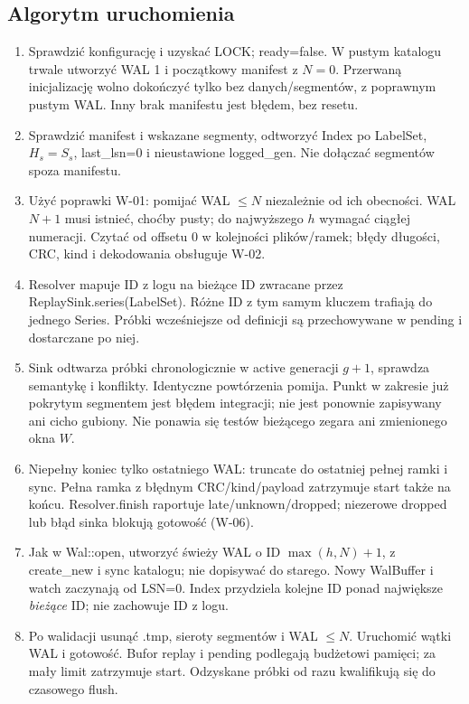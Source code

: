 \documentclass[11pt,a4paper]{article}
\begin{document}
\subsection{Algorytm uruchomienia}
\begin{enumerate}
\item Sprawdzić konfigurację i uzyskać LOCK; ready=false.
W pustym katalogu trwale utworzyć WAL 1 i początkowy manifest z $N=0$.
Przerwaną inicjalizację wolno dokończyć tylko bez danych/segmentów,
z poprawnym pustym WAL. Inny brak manifestu jest błędem, bez resetu.
\item Sprawdzić manifest i wskazane segmenty, odtworzyć Index po
LabelSet, $H_s=S_s$, last\_lsn=0 i nieustawione logged\_gen.
Nie dołączać segmentów spoza manifestu.
\item Użyć poprawki W-01: pomijać WAL $\leq N$ niezależnie od ich obecności.
WAL $N+1$ musi istnieć, choćby pusty; do najwyższego $h$ wymagać ciągłej numeracji.
Czytać od offsetu 0 w kolejności plików/ramek; błędy długości,
CRC, kind i dekodowania obsługuje W-02.
\item Resolver mapuje ID z logu na bieżące ID zwracane przez
ReplaySink.series(LabelSet). Różne ID z tym samym kluczem trafiają
do jednego Series. Próbki wcześniejsze od definicji są przechowywane
w pending i dostarczane po niej.
\item Sink odtwarza próbki chronologicznie w active generacji $g+1$,
sprawdza semantykę i konflikty. Identyczne powtórzenia pomija.
Punkt w zakresie już pokrytym segmentem jest błędem integracji;
nie jest ponownie zapisywany ani cicho gubiony.
Nie ponawia się testów bieżącego zegara ani zmienionego okna $W$.
\item Niepełny koniec tylko ostatniego WAL: truncate do ostatniej
pełnej ramki i sync. Pełna ramka z błędnym CRC/kind/payload zatrzymuje
start także na końcu. Resolver.finish raportuje late/unknown/dropped;
niezerowe dropped lub błąd sinka blokują gotowość (W-06).
\item Jak w Wal::open, utworzyć świeży WAL o ID
$\max(h,N)+1$, z create\_new i sync katalogu; nie dopisywać do starego.
Nowy WalBuffer i watch zaczynają od LSN=0. Index przydziela kolejne
ID ponad największe \emph{bieżące} ID; nie zachowuje ID z logu.
\item Po walidacji usunąć .tmp, sieroty segmentów i WAL $\leq N$.
Uruchomić wątki WAL i gotowość. Bufor replay i pending podlegają
budżetowi pamięci; za mały limit zatrzymuje start.
Odzyskane próbki od razu kwalifikują się do czasowego flush.
\end{enumerate}
\end{document}
